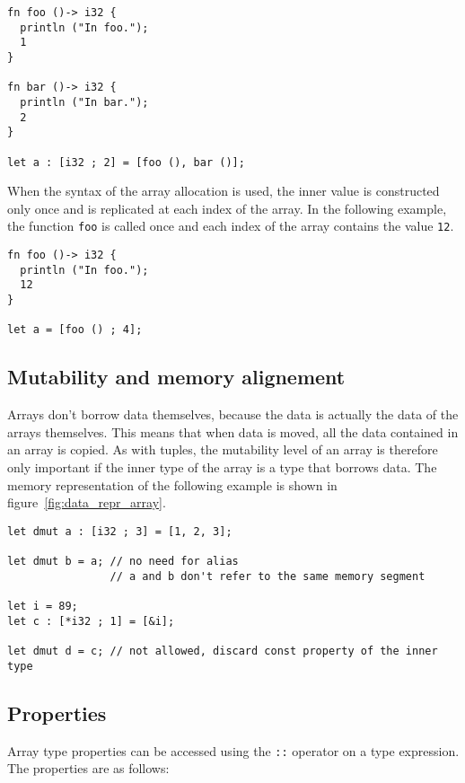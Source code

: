 \begin{lstlisting}[style=coloredverbatim]
fn foo ()-> i32 {
  println ("In foo.");
  1
}

fn bar ()-> i32 {
  println ("In bar.");
  2
}

let a : [i32 ; 2] = [foo (), bar ()];
\end{lstlisting}

When the syntax of the array allocation is used, the inner value is constructed only once and is replicated at each index of the array. In the following example, the function \texttt{foo} is called once and each index of the array contains the value \texttt{12}.

\begin{lstlisting}[style=coloredverbatim]
fn foo ()-> i32 {
  println ("In foo.");
  12
}

let a = [foo () ; 4];
\end{lstlisting}

\subsection {Mutability and memory alignement}

Arrays don't borrow data themselves, because the data is actually the data of
the arrays themselves. This means that when data is moved, all the data
contained in an array is copied. As with tuples, the mutability level of an
array is therefore only important if the inner type of the array is a type that
borrows data. The memory representation of the following example is shown in
figure~\ref{fig:data_repr_array}.

\begin{lstlisting}[style=coloredverbatim]
let dmut a : [i32 ; 3] = [1, 2, 3];

let dmut b = a; // no need for alias
                // a and b don't refer to the same memory segment

let i = 89;
let c : [*i32 ; 1] = [&i];

let dmut d = c; // not allowed, discard const property of the inner type
\end{lstlisting}



\subsection {Properties}

Array type properties can be accessed using the \texttt{::} operator on a type
expression. The properties are as follows:


